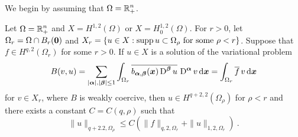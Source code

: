 We begin by assuming that $\displaystyle \Omega = \mathbb{R}^n_+$.

\begin{prop} \label{ell_regular_Rnp}
Let $\displaystyle \Omega = \mathbb{R}^n_+$ and
$\displaystyle X = H^{1,2}(\Omega)$ or
$\displaystyle X = H^{1,2}_0(\Omega)$.  For $r>0$, let
$\displaystyle \Omega_r = \Omega \cap B_r({\bm{0}})$
and
$\displaystyle X_r = \left\{ u \in X : \operatorname{supp} u \subset \Omega_\rho \
\text{for some} \ \rho <r \right\}$.
Suppose that $\displaystyle f \in H^{q,2}(\Omega_r)$ for some $r>0$.
If $u\in X$ is a solution of the variational problem
\begin{equation} \label{ell_var_reg}
B(v,u) =
\sum_{|{\bm{\alpha}}|,|{\bm{\beta}}|\leq 1}
\int_{\Omega_r} \overline{b_{{\bm{\alpha}},{\bm{\beta}}}({\bm{x}})
\operatorname{D}^{{\bm{\beta}}} u}\, \operatorname{D}^{{\bm{\alpha}}} v
\,\mathrm{d}{{\bm{x}}} = \int_{\Omega_r} \overline{f}\,v \,\mathrm{d}{{\bm{x}}}
\end{equation}
for $\displaystyle v \in X_r$, where $B$ is weakly coercive, then
$\displaystyle u\in H^{q+2,2}(\Omega_\rho)$ for
$\rho<r$ and there exists a constant $C = C(q,\rho)$ such that
\[
\|u\|_{q+2.2,\Omega_\rho} \leq C \left( \|f\|_{q,2,\Omega_r} +
\|u\|_{1,2,\Omega_r} \right) \ .
\]
\end{prop}


